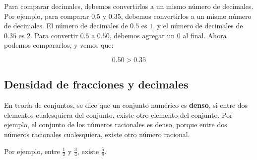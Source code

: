 Para comparar decimales, debemos convertirlos a un mismo número de decimales. Por ejemplo, para comparar $0.5$ y $0.35$, debemos convertirlos a un mismo número de decimales. El número de decimales de $0.5$ es $1$, y el número de decimales de $0.35$ es $2$. Para convertir $0.5$ a $0.50$, debemos agregar un $0$ al final. Ahora podemos compararlos, y vemos que:

\[0.50>0.35\]

\begin{center}
\end{center}

\subsection{Densidad de fracciones y decimales}

En teoría de conjuntos, se dice que un conjunto numérico es \textbf{denso}, si entre dos elementos cualesquiera del conjunto, existe otro elemento del conjunto. Por ejemplo, el conjunto de los números racionales es denso, porque entre dos números racionales cualesquiera, existe otro número racional.

Por ejemplo, entre $\frac{1}{2}$ y $\frac{3}{4}$, existe $\frac{5}{8}$.\\


